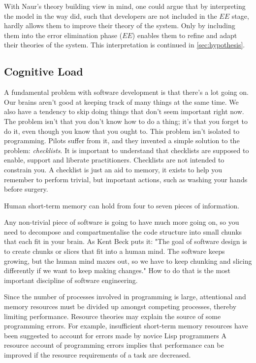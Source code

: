 With Naur's theory building view in mind, one could argue that by interpreting the model in the way \citeauthor{northover_agile_2007} did, such that developers are not included in the $EE$ stage, hardly allows them to improve their theory of the system.
Only by including them into the error elimination phase ($EE$) enables them to refine and adapt their theories of the system.
This interpretation is continued in \ref{sec:hypothesis}.


\subsection{Cognitive Load}

\cite{seemann_code_2021}
A fundamental problem with software development is that there's a lot going on. Our brains aren't good at keeping track of many things at the same time.
We also have a tendency to skip doing things that don't seem important right now.
The problem isn't that you don't know how to do a thing; it's that you forget to do it, even though you know that you ought to.
This problem isn't isolated to programming. Pilots suffer from it, and they invented a simple solution to the problem: \emph{checklists}.
It is important to understand that checklists are supposed to enable, support and liberate practitioners.
Checklists are not intended to constrain you.
A checklist is just an aid to memory, it exists to help you remember to perform trivial, but important actions, such as washing your hands before surgery.

Human short-term memory can hold from four to seven pieces of information. \cite{shaw_memory_2016}

Any non-trivial piece of software is going to have much more going on, so you need to decompose and compartmentalise the code structure into small chunks that each fit in your brain.
As Kent Beck puts it:
"The goal of software design is to create chunks or slices that fit into a human mind. The software keeps growing, but the human mind maxes out, so we have to keep chunking and slicing differently if we want to keep making changes."
How to do that is the most important discipline of software engineering.

\cite{ormerod_human_1990}
Since the number of processes involved in programming is large, attentional and memory resources must be divided up amongst competing processes, thereby limiting performance.
Resource theories may explain the source of some programming errors.
For example, insufficient short-term memory resources have been suggested to account for errors made by novice Lisp programmers
A resource account of programming errors implies that performance can be improved if the resource requirements of a task are decreased.

